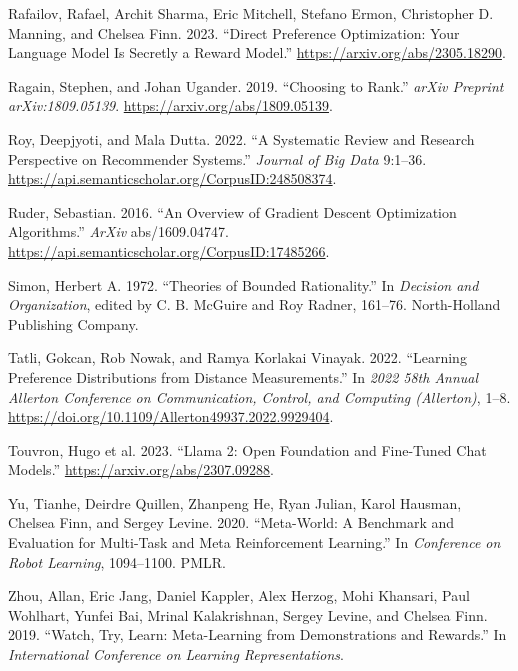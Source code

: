 \documentclass[
  letterpaper,
  numbers=noenddot,
  DIV=11,
  oneside]{scrreprt}
\newlength{\cslhangindent}
\newenvironment{CSLReferences}[2] %
 {\begin{list}{}{%
  \setlength{\itemindent}{0pt}
  \setlength{\leftmargin}{0pt}
  \setlength{\parsep}{0pt}
  \ifodd #1
   \setlength{\leftmargin}{\cslhangindent}
   \setlength{\itemindent}{-1\cslhangindent}
  \fi
  \setlength{\itemsep}{#2\baselineskip}}}
 {\end{list}}
\theoremstyle{remark}
\begin{document}
\begin{CSLReferences}{1}{0}
Rafailov, Rafael, Archit Sharma, Eric Mitchell, Stefano Ermon,
Christopher D. Manning, and Chelsea Finn. 2023. {``Direct Preference
Optimization: Your Language Model Is Secretly a Reward Model.''}
\url{https://arxiv.org/abs/2305.18290}.

Ragain, Stephen, and Johan Ugander. 2019. {``Choosing to Rank.''}
\emph{arXiv Preprint arXiv:1809.05139}.
\url{https://arxiv.org/abs/1809.05139}.

Roy, Deepjyoti, and Mala Dutta. 2022. {``A Systematic Review and
Research Perspective on Recommender Systems.''} \emph{Journal of Big
Data} 9:1--36. \url{https://api.semanticscholar.org/CorpusID:248508374}.

Ruder, Sebastian. 2016. {``An Overview of Gradient Descent Optimization
Algorithms.''} \emph{ArXiv} abs/1609.04747.
\url{https://api.semanticscholar.org/CorpusID:17485266}.

Simon, Herbert A. 1972. {``Theories of Bounded Rationality.''} In
\emph{Decision and Organization}, edited by C. B. McGuire and Roy
Radner, 161--76. North-Holland Publishing Company.

Tatli, Gokcan, Rob Nowak, and Ramya Korlakai Vinayak. 2022. {``Learning
Preference Distributions from Distance Measurements.''} In \emph{2022
58th Annual Allerton Conference on Communication, Control, and Computing
(Allerton)}, 1--8.
\url{https://doi.org/10.1109/Allerton49937.2022.9929404}.

Touvron, Hugo et al. 2023. {``Llama 2: Open Foundation and Fine-Tuned
Chat Models.''} \url{https://arxiv.org/abs/2307.09288}.

Yu, Tianhe, Deirdre Quillen, Zhanpeng He, Ryan Julian, Karol Hausman,
Chelsea Finn, and Sergey Levine. 2020. {``Meta-World: A Benchmark and
Evaluation for Multi-Task and Meta Reinforcement Learning.''} In
\emph{Conference on Robot Learning}, 1094--1100. PMLR.

Zhou, Allan, Eric Jang, Daniel Kappler, Alex Herzog, Mohi Khansari, Paul
Wohlhart, Yunfei Bai, Mrinal Kalakrishnan, Sergey Levine, and Chelsea
Finn. 2019. {``Watch, Try, Learn: Meta-Learning from Demonstrations and
Rewards.''} In \emph{International Conference on Learning
Representations}.

\end{CSLReferences}
\end{document}
